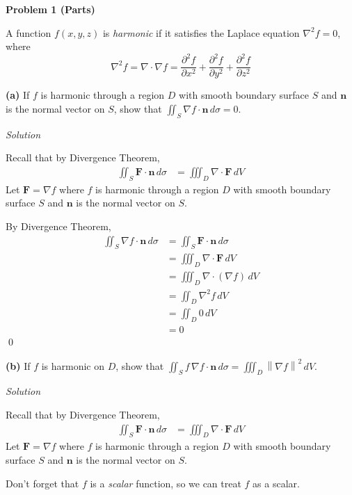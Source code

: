\documentclass{article}
\newcommand{\lrp}[1]{\left( #1 \right)}
\newcommand{\norm}[1]{\left\lVert #1 \right\rVert}
\newcommand{\F}[0]{\mathbf{F}}
\newcommand{\n}[0]{\mathbf{n}}
\newcommand{\Solution}{\textit{Solution}}
\begin{document}
{}\textbf{Problem 1 (Parts)}

A function $f(x,y,z)$ is \textit{harmonic} if it satisfies the Laplace equation $\nabla ^2 f=0$, where
\begin{equation*}
    \nabla^2 f =\nabla \cdot \nabla f =\frac{\partial^2 f}{\partial x^2}+\frac{\partial^2 f}{\partial y^2}+\frac{\partial^2 f}{\partial z^2}
\end{equation*}

{}\textbf{(a)} If $f$ is harmonic through a region $D$ with smooth boundary surface $S$ and $\n$ is the normal vector on $S$, show that $\displaystyle \iint_S \nabla f\cdot\n\,d\sigma=0$.

\Solution

Recall that by Divergence Theorem,
\begin{align*}
   \iint_S \F\cdot \n \,d\sigma&= \iiint_D \nabla \cdot \F\,dV
\end{align*}
Let $\F=\nabla f$ where $f$ is harmonic through a region $D$ with smooth boundary surface $S$ and $\n$ is the normal vector on $S$. 

By Divergence Theorem,
\begin{align*}
 \iint_S\nabla f\cdot \n\,d\sigma&= \iint_S \F\cdot \n \,d\sigma\\
 &= \iiint_D \nabla \cdot \F\,dV\\
  &=\iiint_D \nabla \cdot \lrp{\nabla f}\,dV\\
  &=\iint_D \nabla ^2 f\,dV\\
  &=\iint_D 0\,dV\tag{$f$ is harmonic}\\
  &=0
\end{align*}
\qed


{}\textbf{(b)} If $f$ is harmonic on $D$, show that $\displaystyle \iint_S f\,\nabla f \cdot \n \,d\sigma=\iiint_D \norm{\nabla f}^2\,dV$.

\Solution

Recall that by Divergence Theorem,
\begin{align*}
   \iint_S \F\cdot \n \,d\sigma&= \iiint_D \nabla \cdot \F\,dV
\end{align*}
Let $\F=\nabla f$ where $f$ is harmonic through a region $D$ with smooth boundary surface $S$ and $\n$ is the normal vector on $S$. 

Don't forget that $f$ is a \textit{scalar} function, so we can treat $f$ as a scalar.
\end{document}
